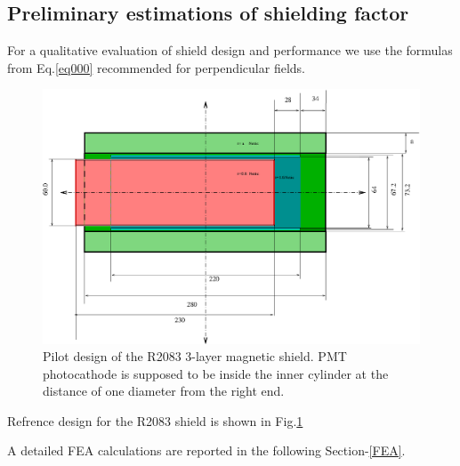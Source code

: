 \documentclass[12pt]{article}
\begin{document}

\subsection{Preliminary estimations of shielding factor}

For a qualitative  evaluation of  
shield design  and performance  we  use the  formulas from 
Eq.\ref{eq000} recommended for  perpendicular fields.
\begin{figure}[htbp]
\centering
\includegraphics[width=1.0\textwidth]{R2083-3000-ph.eps}
\caption{\small{Pilot design of the R2083 3-layer  magnetic shield. PMT photocathode is supposed to be inside the inner cylinder 
 at the distance of one diameter from the right end.}}
\label{VBT3CY}
\end{figure}
Refrence   design  for the   R2083 shield is shown in Fig.\ref{VBT3CY}

A detailed FEA calculations 
are  reported in the following  Section-\ref{FEA}.
\end{document}
